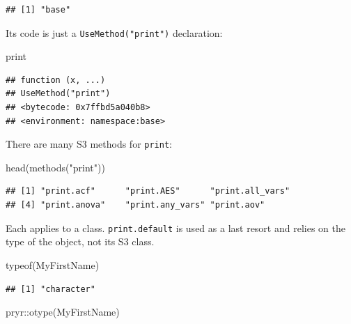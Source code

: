 \documentclass[
  12pt,
  american,
  a4paper,
  extrafontsizes,onecolumn,openright
  ]{memoir}
\newenvironment{Shaded}{\begin{snugshade}}{\end{snugshade}}
\newcommand{\FunctionTok}[1]{\textcolor[rgb]{0.00,0.00,0.00}{#1}}
\newcommand{\NormalTok}[1]{#1}
\newcommand{\SpecialCharTok}[1]{\textcolor[rgb]{0.00,0.00,0.00}{#1}}
\newcommand{\StringTok}[1]{\textcolor[rgb]{0.31,0.60,0.02}{#1}}
\begin{document}
\begin{verbatim}
## [1] "base"
\end{verbatim}

\normalsize

Its code is just a \texttt{UseMethod("print")} declaration:

\scriptsize

\begin{Shaded}
\begin{Highlighting}[]
\NormalTok{print}
\end{Highlighting}
\end{Shaded}

\begin{verbatim}
## function (x, ...) 
## UseMethod("print")
## <bytecode: 0x7ffbd5a040b8>
## <environment: namespace:base>
\end{verbatim}

\normalsize

There are many S3 methods for \texttt{print}:

\scriptsize

\begin{Shaded}
\begin{Highlighting}[]
\FunctionTok{head}\NormalTok{(}\FunctionTok{methods}\NormalTok{(}\StringTok{"print"}\NormalTok{))}
\end{Highlighting}
\end{Shaded}

\begin{verbatim}
## [1] "print.acf"      "print.AES"      "print.all_vars"
## [4] "print.anova"    "print.any_vars" "print.aov"
\end{verbatim}

\normalsize

Each applies to a class. \texttt{print.default} is used as a last resort and relies on the type of the object, not its S3 class.

\scriptsize

\begin{Shaded}
\begin{Highlighting}[]
\FunctionTok{typeof}\NormalTok{(MyFirstName)}
\end{Highlighting}
\end{Shaded}

\begin{verbatim}
## [1] "character"
\end{verbatim}

\begin{Shaded}
\begin{Highlighting}[]
\NormalTok{pryr}\SpecialCharTok{::}\FunctionTok{otype}\NormalTok{(MyFirstName)}
\end{Highlighting}
\end{Shaded}
\end{document}
